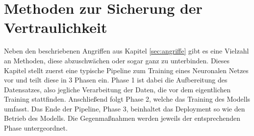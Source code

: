 \chapter{Methoden zur Sicherung der Vertraulichkeit}\label{sec:methoden}

Neben den beschriebenen Angriffen aus Kapitel \ref{sec:angriffe} gibt es eine Vielzahl an Methoden, diese abzuschwächen oder sogar ganz zu unterbinden.
Dieses Kapitel stellt zuerst eine typische Pipeline zum Training eines Neuronalen Netzes vor und teilt diese in 3 Phasen ein.
Phase 1 ist dabei die Aufbereitung des Datensatzes, also jegliche Verarbeitung der Daten, die vor dem eigentlichen Training stattfinden.
Anschließend folgt Phase 2, welche das Training des Modells umfasst.
Das Ende der Pipeline, Phase 3, beinhaltet das Deployment so wie den Betrieb des Modells.
Die Gegenmaßnahmen werden jeweils der entsprechenden Phase untergeordnet.





